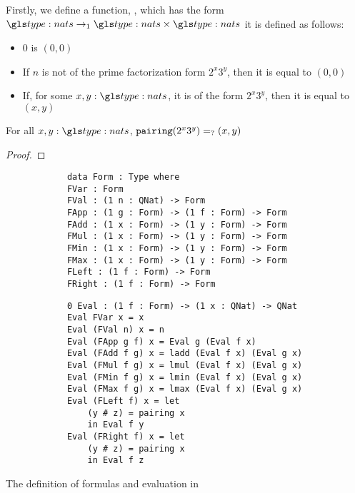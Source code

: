 Firstly, we define a function, , which has the form $\fn_1 {\nat}{\nat \times \nat}$ it is defined as follows:
\begin{itemize}
	\item {} 0 is $(0, 0)$
	\item If $n$ is not of the prime factorization form $2^x 3^y$, then it is equal to $(0, 0)$
	\item If, for some $x, y : \nat$, it is of the form $2^x 3^y$, then it is equal to $(x, y)$
\end{itemize}

\begin{corollary}
	For all $x, y : \nat$, ${\mathtt{pairing}} (2^x 3^y) =_? (x, y)$
\end{corollary}
\begin{proof}
\end{proof}


\begin{listing}
	\begin{multicols}{2}
		\begin{verbatim}
			data Form : Type where 
			FVar : Form 
			FVal : (1 n : QNat) -> Form 
			FApp : (1 g : Form) -> (1 f : Form) -> Form
			FAdd : (1 x : Form) -> (1 y : Form) -> Form
			FMul : (1 x : Form) -> (1 y : Form) -> Form
			FMin : (1 x : Form) -> (1 y : Form) -> Form
			FMax : (1 x : Form) -> (1 y : Form) -> Form
			FLeft : (1 f : Form) -> Form
			FRight : (1 f : Form) -> Form
		\end{verbatim}
		
		\begin{verbatim}
			0 Eval : (1 f : Form) -> (1 x : QNat) -> QNat
			Eval FVar x = x
			Eval (FVal n) x = n
			Eval (FApp g f) x = Eval g (Eval f x)
			Eval (FAdd f g) x = ladd (Eval f x) (Eval g x)
			Eval (FMul f g) x = lmul (Eval f x) (Eval g x)
			Eval (FMin f g) x = lmin (Eval f x) (Eval g x)
			Eval (FMax f g) x = lmax (Eval f x) (Eval g x)
			Eval (FLeft f) x = let 
				(y # z) = pairing x 
				in Eval f y
			Eval (FRight f) x = let 
				(y # z) = pairing x 
				in Eval f z
		\end{verbatim}
	\end{multicols}
	
	\caption{The definition of formulas and evaluation in \thislib}
	\label{lst:form_def}
\end{listing}

